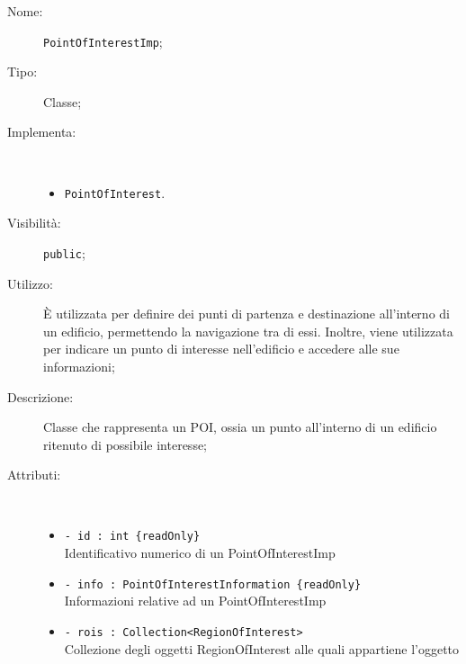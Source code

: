 \documentclass[../DefinizioneDiProdotto.tex]{subfiles}
\begin{document}
    \begin{description}
\item[Nome:] \texttt{PointOfInterestImp};
\item[Tipo:] Classe;
\item[Implementa:] \
\begin{itemize}
\item \texttt{PointOfInterest}.

\end{itemize}
\item[Visibilità:] \texttt{public};
\item[Utilizzo:] È utilizzata per definire dei punti di partenza e destinazione all'interno di un edificio, permettendo la navigazione tra di essi. Inoltre, viene utilizzata per indicare un punto di interesse nell'edificio e accedere alle sue informazioni;
\item[Descrizione:] Classe che rappresenta un POI, ossia un punto all'interno di un edificio ritenuto di possibile interesse;
\item[Attributi:] \
\begin{itemize}
\item \texttt{- id  : int \{readOnly\}}\\
Identificativo numerico di un PointOfInterestImp

\item \texttt{- info : PointOfInterestInformation \{readOnly\}}\\
Informazioni relative ad un PointOfInterestImp

\item \texttt{- rois : Collection<RegionOfInterest>}\\
Collezione degli oggetti RegionOfInterest alle quali appartiene l'oggetto


\end{itemize}
\end{description}
\end{document}
